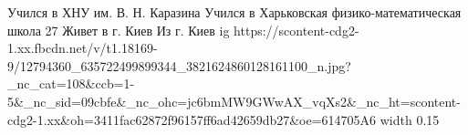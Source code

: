  
 
 
 
 

\par
Учился в ХНУ им. В. Н. Каразина
Учился в Харьковская физико-математическая школа 27
Живет в г. Киев
Из г. Киев
\ifcmt
  ig https://scontent-cdg2-1.xx.fbcdn.net/v/t1.18169-9/12794360_635722499899344_3821624860128161100_n.jpg?_nc_cat=108&ccb=1-5&_nc_sid=09cbfe&_nc_ohc=jc6bmMW9GWwAX_vqXs2&_nc_ht=scontent-cdg2-1.xx&oh=3411fac62872f96157ff6ad42659db27&oe=614705A6
  width 0.15
\fi

